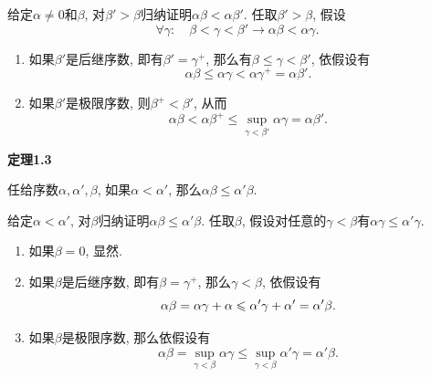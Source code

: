 \documentclass[UTF8]{ctexart}
\begin{document}

给定$\alpha\neq 0$和$\beta$, 对$\beta'>\beta$归纳证明$\alpha\beta<\alpha\beta'$.
任取$\beta'>\beta$, 假设
\[
    \forall\gamma:\quad\beta<\gamma<\beta'\to\alpha\beta<\alpha\gamma.
\]

\begin{enumerate}
    \item 如果$\beta'$是后继序数, 即有$\beta'=\gamma^+$,
    那么有$\beta\leqslant\gamma<\beta'$, 依假设有
    \[
        \alpha\beta\leqslant\alpha\gamma<\alpha\gamma^+=\alpha\beta'.
    \]
    \item 如果$\beta'$是极限序数, 则$\beta^+<\beta'$, 从而
    \begin{equation*}
        \alpha\beta<\alpha\beta^+\leqslant
        \sup_{\gamma<\beta'}\alpha\gamma=\alpha\beta'.
    \tag*{\qedsymbol}\end{equation*}
\end{enumerate}

\vspace{10pt}

\hypertarget{sec:定理1.3}{}
\noindent\textbf{定理1.3}

任给序数$\alpha,\alpha',\beta$, 如果$\alpha<\alpha'$,
那么$\alpha\beta\leqslant\alpha'\beta$.


给定$\alpha<\alpha'$, 对$\beta$归纳证明$\alpha\beta\leqslant\alpha'\beta$.
任取$\beta$, 假设对任意的$\gamma<\beta$有$\alpha\gamma\leqslant\alpha'\gamma$.

\begin{enumerate}
    \item 如果$\beta=0$, 显然.
    \item 如果$\beta$是后继序数, 即有$\beta=\gamma^+$, 那么$\gamma<\beta$, 依假设有
    \[
        \alpha\beta=\alpha\gamma+\alpha\leqslant\alpha'\gamma+\alpha'=\alpha'\beta.
        \\[1pt]
    \]
    \item 如果$\beta$是极限序数, 那么依假设有
    \vspace{-1pt}
    \begin{equation*}
        \alpha\beta=\sup_{\gamma<\beta}\alpha\gamma\leqslant
        \sup_{\gamma<\beta}\alpha'\gamma=\alpha'\beta.
    \tag*{\qedsymbol}\end{equation*}
\end{enumerate}





\newpage
\end{document}
